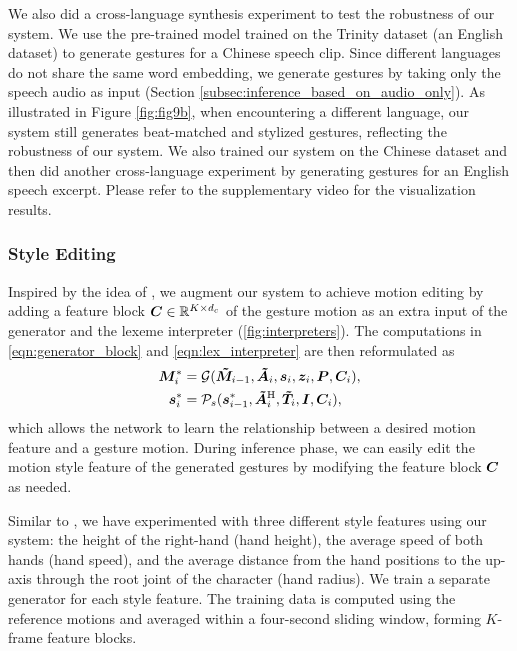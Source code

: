 We also did a cross-language synthesis experiment to test the robustness of our system. We use the pre-trained model trained on the Trinity dataset (an English dataset) to generate gestures for a Chinese speech clip. Since different languages do not share the same word embedding, we generate gestures by taking only the speech audio as input (Section \ref{subsec:inference_based_on_audio_only}). As illustrated in Figure \ref{fig:fig9b}, when encountering a different language, our system still generates beat-matched and stylized gestures, reflecting the robustness of our system. We also trained our system on the Chinese dataset and then did another cross-language experiment by generating gestures for an English speech excerpt. Please refer to the supplementary video for the visualization results.

\subsubsection{Style Editing}
\label{subsubsec:style_editing}
Inspired by the idea of \citet{alexanderson2020style}, we augment our system to achieve motion editing by adding a feature block $\bm{C} \in\mathbb{R}^{K\times{}d_{c}}$ of the gesture motion as an extra input of the generator and the lexeme interpreter (\fig\ref{fig:interpreters}). The computations in \eqn\eqref{eqn:generator_block} and \eqref{eqn:lex_interpreter} are then reformulated as
\begin{align}
    \bm{M}_{i}^* &=\mathcal{G}(\bm{\tilde{M}}_{i-1},\bm{\tilde{A}}_{i},\bm{s}_i,\bm{z}_i,\bm{P},\bm{C}_i), \\
    \bm{s}_i^* &=\mathcal{P}_s(\bm{s}_{i-1}^*, \bm{\tilde{A}}_i^{{\text{H}}}, \bm{\tilde{T}}_i, \bm{I},\bm{C}_i), 
\end{align}
which allows the network to learn the relationship between a desired motion feature and a gesture motion. During inference phase, we can easily edit the motion style feature of the generated gestures by modifying the feature block $\bm{C}$ as needed.

Similar to \cite{alexanderson2020style}, we have experimented with three different style features using our system: the height of the right-hand (hand height), the average speed of both hands (hand speed), and the average distance from the hand positions to the up-axis through the root joint of the character (hand radius). We train a separate generator for each style feature. The training data is computed using the reference motions and averaged within a four-second sliding window, forming $K$-frame feature blocks. 

